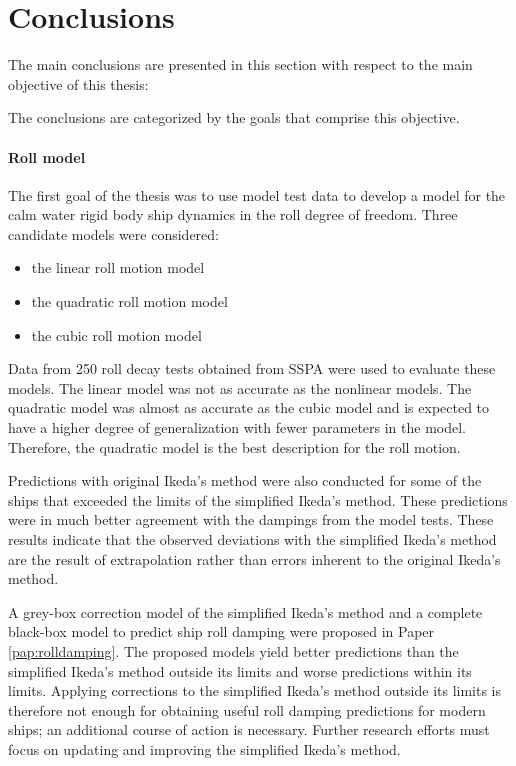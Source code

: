 \chapter{Conclusions\label{ch:conclusions}}
The main conclusions are presented in this section with respect to the main objective of this thesis:
\begin{quote} 
\expandafter\MakeUppercase \objective
\end{quote}
\noindent The conclusions are categorized by the goals that comprise this objective.

\subsubsection*{\normalfont \color{black} \textbf{Roll model}}
The first goal of the thesis was to use model test data to develop a model for the calm water rigid body ship dynamics in the roll degree of freedom. 
Three candidate models were considered: 
\begin{itemize}
    \item the linear roll motion model
    \item the quadratic roll motion model
    \item the cubic roll motion model
\end{itemize}
\noindent Data from 250 roll decay tests obtained from SSPA were used to evaluate these models. The linear model was not as accurate as the nonlinear models. The quadratic model was almost as accurate as the cubic model and is expected to have a higher degree of generalization with fewer parameters in the model. Therefore,  the quadratic model is the best description for the roll motion. 

Predictions with original Ikeda's method were also conducted for some of the ships that exceeded the limits of the simplified Ikeda's method. These predictions were in much better agreement with the dampings from the model tests. These results indicate that the observed deviations with the simplified Ikeda's method are the result of extrapolation rather than errors inherent 
to the original Ikeda's method.

A grey-box correction model of the simplified Ikeda's method and a complete black-box model to predict ship roll damping were proposed in Paper \ref{pap:rolldamping}. The proposed models yield better predictions than the simplified Ikeda's method outside its limits and worse predictions within its limits. Applying corrections to the simplified Ikeda's method outside its limits is therefore not enough for obtaining useful roll damping predictions for modern ships; an additional course of action is necessary. Further research efforts must focus on updating and improving the simplified Ikeda's method.

